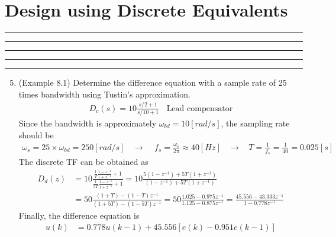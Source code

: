 \setcounter{chapter}{7}
\setcounter{section}{2}
\section{Design using Discrete Equivalents}
\vspace{-8pt} \hrule \hrule \hrule \hrule \hrule  \vspace{12pt}
\begin{enumerate}
	\setcounter{enumi}{4}
	\item (Example 8.1) Determine the difference equation with a sample rate of 25 times bandwidth using Tustin's approximation. 
		\begin{align*}
			D_c(s) = 10 \frac{s/2+1}{s/10+1} ~~~~ \text{Lead compensator} 
		\end{align*}
		Since the bandwidth is approximately $\omega_{bd} = 10[rad/s]$, the sampling rate should be
		\begin{align*}
			\omega_s = 25 \times \omega_{bd} = 250 [rad/s] ~~~~ \rightarrow~~~~~ f_s = \frac{\omega_s}{2\pi} \approx 40[Hz] ~~~~\rightarrow~~~~ T = \frac{1}{f_s} = \frac{1}{40} = 0.025[s]
		\end{align*}
		The discrete TF can be obtained as 
		\begin{align*}
			D_d(z) &= 10 \frac{\frac{1}{T} \frac{1-z^{-1}}{1+z^{-1}}+1}{\frac{1}{5T} \frac{1-z^{-1}}{1+z^{-1}}+1} =  10 \frac{5(1-z^{-1})+ 5T(1+z^{-1})}{(1-z^{-1})+ 5T(1+z^{-1})} \\
			&= 50 \frac{(1+T) - (1-T)z^{-1}}{(1+5T) - (1-5T)z^{-1}} 
			= 50 \frac{1.025 - 0.975z^{-1}}{1.125 - 0.875z^{-1}} 
			= \frac{45.556 - 43.333 z^{-1}}{1 - 0.778z^{-1}}
		\end{align*}
		Finally, the difference equation is 
		\begin{align*}
			u(k) &= 0.778 u(k-1) + 45.556 [ e(k) -  0.951 e(k-1) ]
		\end{align*}
\end{enumerate}		